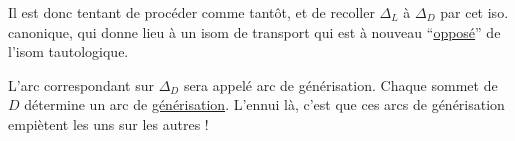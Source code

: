 Il est donc tentant de procéder comme tantôt, et de recoller $\Delta_L$ à $\Delta_D$ par cet iso. canonique, qui donne lieu à un isom de transport
qui est à nouveau ``\uline{opposé}'' de l'isom tautologique.

L'arc correspondant sur $\Delta_D$ sera appelé arc de générisation. Chaque sommet de $D$ détermine un arc de \uline{générisation}. L'ennui là, c'est que ces arcs de générisation empiètent les uns sur les autres !
